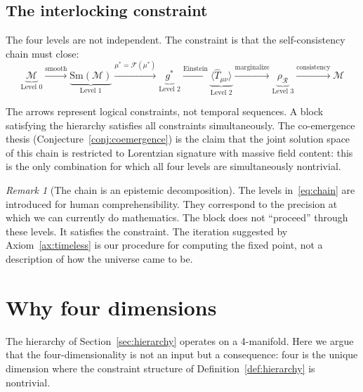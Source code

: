 \documentclass[12pt,a4paper]{article}
\theoremstyle{definition}
\theoremstyle{remark}
\newtheorem{remark}{Remark}
\begin{document}
\subsection{The interlocking constraint}
\label{sec:interlock}

The four levels are not independent. The constraint is that the
self-consistency chain must close:
\begin{equation}
\underbrace{\mathcal{M}}_{\text{Level 0}}
\xrightarrow{\text{smooth}}
\underbrace{\mathrm{Sm}(\mathcal{M})}_{\text{Level 1}}
\xrightarrow{\mu^* = \mathcal{F}(\mu^*)}
\underbrace{g^*}_{\text{Level 2}}
\xrightarrow{\text{Einstein}}
\underbrace{\langle\hat{T}_{\mu\nu}\rangle}_{\text{Level 2}}
\xrightarrow{\text{marginalize}}
\underbrace{\rho_\mathcal{R}}_{\text{Level 3}}
\xrightarrow{\text{consistency}}
\mathcal{M}
\label{eq:chain}
\end{equation}

The arrows represent logical constraints, not temporal sequences. A
block satisfying the hierarchy satisfies all constraints simultaneously.
The co-emergence thesis (Conjecture~\ref{conj:coemergence}) is the claim
that the joint solution space of this chain is restricted to Lorentzian
signature with massive field content: this is the only combination for
which all four levels are simultaneously nontrivial.

\begin{remark}[The chain is an epistemic decomposition]
The levels in~\eqref{eq:chain} are introduced for human
comprehensibility. They correspond to the precision at which we can
currently do mathematics. The block does not ``proceed'' through these
levels. It satisfies the constraint. The iteration suggested by
Axiom~\ref{ax:timeless} is our procedure for computing the fixed point,
not a description of how the universe came to be.
\end{remark}

\section{Why four dimensions}
\label{sec:dimensions}

The hierarchy of Section~\ref{sec:hierarchy} operates on a 4-manifold.
Here we argue that the four-dimensionality is not an input but a
consequence: four is the unique dimension where the constraint structure
of Definition~\ref{def:hierarchy} is nontrivial.
\end{document}
